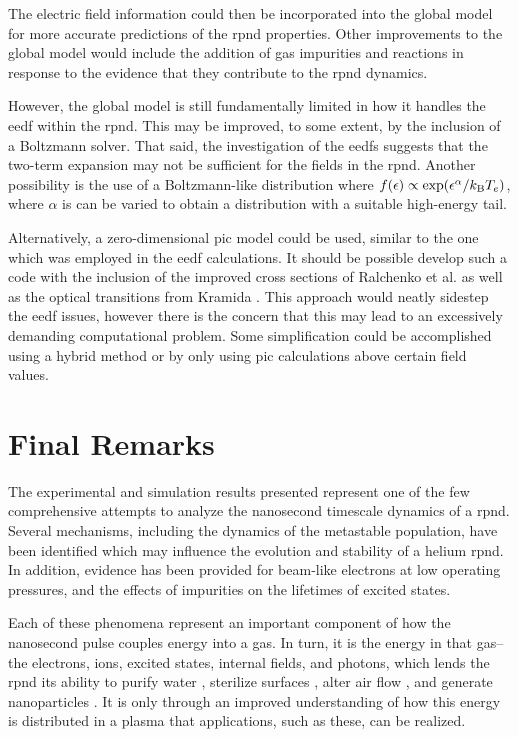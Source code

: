 The electric field information could then be incorporated into the global model
for more accurate predictions of the \acs{rpnd} properties. Other improvements
to the global model would include the addition of gas impurities and reactions
in response to the evidence that they contribute to the \acs{rpnd} dynamics.

However, the global model is still fundamentally limited in how it handles the
\acs{eedf} within the \acs{rpnd}. This may be improved, to some extent, by the
inclusion of a Boltzmann solver. That said, the investigation of the \acs{eedf}s
suggests that the two-term expansion may not be sufficient for the fields in the
\acs{rpnd}. Another possibility is the use of a Boltzmann-like distribution
where $f(\epsilon)\propto \exp (\epsilon^\alpha / k_\mathrm{B} T_e)$, where $\alpha$ is
can be varied to obtain a distribution with a suitable high-energy tail.

Alternatively, a zero-dimensional \acs{pic} model could be used, similar to the
one which was employed in the \acs{eedf} calculations. It should be possible
develop such a code with the inclusion of the improved cross sections of
Ralchenko et al. \cite{Ralchenko2008} as well as the optical transitions from
Kramida \cite{Kramida2012}. This approach would neatly sidestep the \acs{eedf}
issues, however there is the concern that this may lead to an excessively
demanding computational problem. Some simplification could be accomplished using
a hybrid method or by only using \acs{pic} calculations above certain field
values.

\section{Final Remarks}

The experimental and simulation results presented represent one of the few
comprehensive attempts to analyze the nanosecond timescale dynamics of a
\acs{rpnd}. Several mechanisms, including the dynamics of the metastable
population, have been identified which may influence the evolution and stability
of a helium \acs{rpnd}. In addition, evidence has been provided for beam-like
electrons at low operating pressures, and the effects of impurities on the
lifetimes of excited states.

Each of these phenomena represent an important component of how the nanosecond
pulse couples energy into a gas. In turn, it is the energy in that gas--the
electrons, ions, excited states, internal fields, and photons, which lends the
\acs{rpnd} its ability to purify water \cite{Malik2001}, sterilize surfaces
\cite{Ayan2009}, alter air flow \cite{Nishihara2007}, and generate nanoparticles
\cite{Ostrikov2011}. It is only through an improved understanding of how this
energy is distributed in a plasma that applications, such as these, can be
realized.
